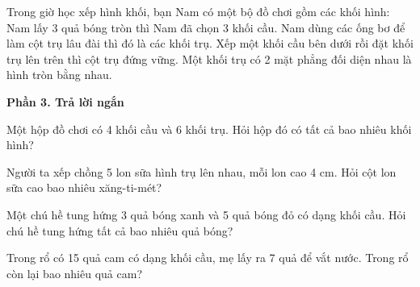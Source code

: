 \begin{ex} %
Trong giờ học xếp hình khối, bạn Nam có một bộ đồ chơi gồm các khối hình:
\choiceTF
{\True Nam lấy 3 quả bóng tròn thì Nam đã chọn 3 khối cầu.}
{\True Nam dùng các ống bơ để làm cột trụ lâu đài thì đó là các khối trụ.}
{Xếp một khối cầu bên dưới rồi đặt khối trụ lên trên thì cột trụ đứng vững.}
{\True Một khối trụ có 2 mặt phẳng đối diện nhau là hình tròn bằng nhau.}
\end{ex}

\textbf{Phần 3. Trả lời ngắn}

\begin{ex} %
Một hộp đồ chơi có 4 khối cầu và 6 khối trụ. Hỏi hộp đó có tất cả bao nhiêu khối hình?
\end{ex}

\begin{ex} %
Người ta xếp chồng 5 lon sữa hình trụ lên nhau, mỗi lon cao 4 cm. Hỏi cột lon sữa cao bao nhiêu xăng-ti-mét?
\end{ex}

\begin{ex} %
Một chú hề tung hứng 3 quả bóng xanh và 5 quả bóng đỏ có dạng khối cầu. Hỏi chú hề tung hứng tất cả bao nhiêu quả bóng?
\end{ex}

\begin{ex} %
Trong rổ có 15 quả cam có dạng khối cầu, mẹ lấy ra 7 quả để vắt nước. Trong rổ còn lại bao nhiêu quả cam?
\end{ex}

